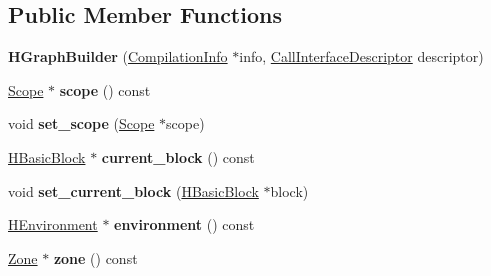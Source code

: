 \subsection*{Public Member Functions}
\begin{DoxyCompactItemize}
\item 
{\bfseries H\+Graph\+Builder} (\hyperlink{classv8_1_1internal_1_1_compilation_info}{Compilation\+Info} $\ast$info, \hyperlink{classv8_1_1internal_1_1_call_interface_descriptor}{Call\+Interface\+Descriptor} descriptor)\hypertarget{classv8_1_1internal_1_1_h_graph_builder_ab0a0e270b5d9a98e012218daeb2815b9}{}\label{classv8_1_1internal_1_1_h_graph_builder_ab0a0e270b5d9a98e012218daeb2815b9}

\item 
\hyperlink{classv8_1_1internal_1_1_scope}{Scope} $\ast$ {\bfseries scope} () const \hypertarget{classv8_1_1internal_1_1_h_graph_builder_a0a465994ebb126f9b90d1898f91442aa}{}\label{classv8_1_1internal_1_1_h_graph_builder_a0a465994ebb126f9b90d1898f91442aa}

\item 
void {\bfseries set\+\_\+scope} (\hyperlink{classv8_1_1internal_1_1_scope}{Scope} $\ast$scope)\hypertarget{classv8_1_1internal_1_1_h_graph_builder_a776be88cba46abad6c62cd37a5bd08ef}{}\label{classv8_1_1internal_1_1_h_graph_builder_a776be88cba46abad6c62cd37a5bd08ef}

\item 
\hyperlink{classv8_1_1internal_1_1_h_basic_block}{H\+Basic\+Block} $\ast$ {\bfseries current\+\_\+block} () const \hypertarget{classv8_1_1internal_1_1_h_graph_builder_a6b0d44a14bf0757687af734f79c764e9}{}\label{classv8_1_1internal_1_1_h_graph_builder_a6b0d44a14bf0757687af734f79c764e9}

\item 
void {\bfseries set\+\_\+current\+\_\+block} (\hyperlink{classv8_1_1internal_1_1_h_basic_block}{H\+Basic\+Block} $\ast$block)\hypertarget{classv8_1_1internal_1_1_h_graph_builder_a30bed3013c6b3f0aa896b66a7858f139}{}\label{classv8_1_1internal_1_1_h_graph_builder_a30bed3013c6b3f0aa896b66a7858f139}

\item 
\hyperlink{classv8_1_1internal_1_1_h_environment}{H\+Environment} $\ast$ {\bfseries environment} () const \hypertarget{classv8_1_1internal_1_1_h_graph_builder_ace09f39d064083cf3d464a3b333c8f1a}{}\label{classv8_1_1internal_1_1_h_graph_builder_ace09f39d064083cf3d464a3b333c8f1a}

\item 
\hyperlink{classv8_1_1internal_1_1_zone}{Zone} $\ast$ {\bfseries zone} () const \hypertarget{classv8_1_1internal_1_1_h_graph_builder_a8151f3b70f260e3dafd70e6d3de4b771}{}\label{classv8_1_1internal_1_1_h_graph_builder_a8151f3b70f260e3dafd70e6d3de4b771}


\end{DoxyCompactItemize}
